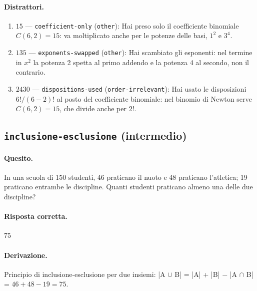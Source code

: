 \paragraph{Distrattori.}
\begin{enumerate}
  \item $15$ --- \texttt{coefficient-only} (\texttt{other}): Hai preso solo il coefficiente binomiale $C(6,2) = 15$: va moltiplicato anche per le potenze delle basi, $1^{2}$ e $3^{4}$.
  \item $135$ --- \texttt{exponents-swapped} (\texttt{other}): Hai scambiato gli esponenti: nel termine in $x^{2}$ la potenza 2 spetta al primo addendo e la potenza 4 al secondo, non il contrario.
  \item $2430$ --- \texttt{dispositions-used} (\texttt{order-irrelevant}): Hai usato le disposizioni $6!/(6-2)!$ al posto del coefficiente binomiale: nel binomio di Newton serve $C(6,2) = 15$, che divide anche per $2!$.
\end{enumerate}

\subsection{\texorpdfstring{\texttt{inclusione-esclusione} (intermedio)}{inclusione-esclusione (intermedio)}}

\paragraph{Quesito.} In una scuola di 150 studenti, 46 praticano il nuoto e 48 praticano l'atletica; 19 praticano entrambe le discipline. Quanti studenti praticano almeno una delle due discipline?

\paragraph{Risposta corretta.} $75$

\paragraph{Derivazione.} Principio di inclusione-esclusione per due insiemi: |A $\cup$ B| = |A| + |B| $-$ |A $\cap$ B| = $46 + 48 - 19 = 75$.

